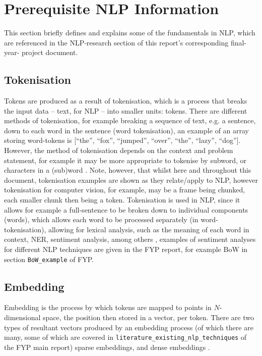 \section{Prerequisite NLP Information}
\label{sec:literature_prerequisite_nlp_information}
This section briefly defines and explains some of the fundamentals in NLP, which are referenced in the NLP-research section of this report's corresponding final-year- project document.
\subsection{Tokenisation}
Tokens are produced as a result of tokenisation, which is a process that breaks the input data -- text, for NLP -- into smaller units: tokens. There are different methods of tokenisation, for example breaking a sequence of text, e.g. a sentence, down to each word in the sentence (word tokenisation), an example of an array storing word-tokens is [``the'', ``fox'', ``jumped'', ``over'', ``the'', ``lazy'', ``dog'']. However, the method of tokenisation depends on the context and problem statement, for example it may be more appropriate to tokenise by subword, or characters in a (sub)word \citep{geeks:tokenisation}. Note, however, that whilst here and throughout this document, tokenisation examples are shown as they relate/apply to NLP, however tokenisation for computer vision, for example, may be a frame being chunked, each smaller chunk then being a token.
Tokenisation is used in NLP, since it allows for example a full-sentence to be broken down to individual components (words), which allows each word to be processed separately (in word-tokenisation), allowing for lexical analysis, such as the meaning of each word in context, NER, sentiment analysis, among others \citep{wikipedia:NLP}, examples of sentiment analyses for different NLP techniques are given in the FYP report, for example BoW in section \verb*|BoW_example| of FYP. %
\subsection{Embedding}
Embedding is the process by which tokens are mapped to points in $N$-dimensional space, the position then stored in a vector, per token.
There are two types of resultant vectors produced by an embedding process (of which there are many, some of which are covered in \verb*|literature_existing_nlp_techniques| of the FYP main report) sparse embeddings, and dense embeddings \citep{zilliz:sparse_dense_embeddings}.
